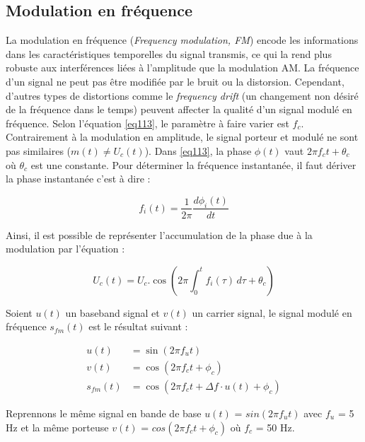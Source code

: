 \subsection{Modulation en fréquence}

La modulation en fréquence (\textit{Frequency modulation, FM}) encode les informations dans les caractéristiques temporelles du signal transmis, ce qui la rend plus robuste aux interférences liées à l'amplitude que la modulation AM. La fréquence d'un signal ne peut pas être modifiée par le bruit ou la distorsion. Cependant, d'autres types de distortions comme le \textit{frequency drift} (un changement non désiré de la fréquence dans le temps) peuvent affecter la qualité d'un signal modulé en fréquence. Selon l'équation \ref{eq113}, le paramètre à faire varier est $f_c$. Contrairement à la modulation en amplitude, le signal porteur et modulé ne sont pas similaires ($m(t) \neq U_c(t)$). Dans \ref{eq113}, la phase $\phi(t)$ vaut $2 \pi f_ct + \theta_c$ où $\theta_c$ est une constante. Pour déterminer la fréquence instantanée, il faut dériver la phase instantanée c'est à dire :

\begin{equation}\label{eq120}
f_i(t) = \frac{1}{2\pi} \frac{d\phi_i(t)}{dt}
\end{equation}

Ainsi, il est possible de représenter l'accumulation de la phase due à la modulation par l'équation :

\begin{equation}\label{eq121}
U_c(t) = U_c.\cos(2 \pi \int_{0}^{t} f_i(\tau) \, d\tau +  \theta_c)
\end{equation}

\vspace{0.1cm}

Soient $u(t)$ un baseband signal et $v(t)$ un carrier signal, le signal modulé en fréquence $s_{fm}(t)$ est le résultat suivant :

\begin{align}
    u(t) &= \sin(2\pi f_{u}t) \\
    v(t) &= \cos(2\pi f_{c}t + \phi_{c}) \\
    s_{fm}(t) &= \cos\left(2\pi f_{c}t + \Delta f \cdot u(t) + \phi_{c}\right)
\end{align}

\vspace{0.1cm}

Reprennons le même signal en bande de base 
$u(t)$ = $sin(2\pi f_{u}t)$ avec $f_{u}$ = 5 Hz et la même porteuse 
$v(t)$ = $cos(2\pi f_{c}t + \phi_{c})$ où $f_{c}$ = 50 Hz.

